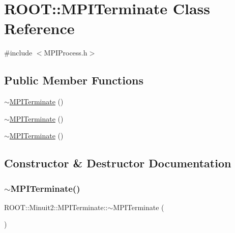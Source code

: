 \hypertarget{classROOT_1_1Minuit2_1_1MPITerminate}{}\section{R\+O\+OT\+:\+:M\+P\+I\+Terminate Class Reference}
\label{classROOT_1_1Minuit2_1_1MPITerminate}


{\ttfamily \#include $<$M\+P\+I\+Process.\+h$>$}

\subsection*{Public Member Functions}
\begin{DoxyCompactItemize}
\item 
\mbox{\hyperlink{classROOT_1_1Minuit2_1_1MPITerminate_a3a0e732a5e0112404bfdd195d7826c98}{$\sim$\+M\+P\+I\+Terminate}} ()
\item 
\mbox{\hyperlink{classROOT_1_1Minuit2_1_1MPITerminate_a3a0e732a5e0112404bfdd195d7826c98}{$\sim$\+M\+P\+I\+Terminate}} ()
\item 
\mbox{\hyperlink{classROOT_1_1Minuit2_1_1MPITerminate_a3a0e732a5e0112404bfdd195d7826c98}{$\sim$\+M\+P\+I\+Terminate}} ()
\end{DoxyCompactItemize}


\subsection{Constructor \& Destructor Documentation}
\mbox{\label{classROOT_1_1Minuit2_1_1MPITerminate_a3a0e732a5e0112404bfdd195d7826c98}} 
\subsubsection{\texorpdfstring{$\sim$MPITerminate()}{~MPITerminate()}\hspace{0.1cm}{\footnotesize\ttfamily [1/3]}}
{\footnotesize\ttfamily R\+O\+O\+T\+::\+Minuit2\+::\+M\+P\+I\+Terminate\+::$\sim$\+M\+P\+I\+Terminate (\begin{DoxyParamCaption}{ }\end{DoxyParamCaption})\hspace{0.3cm}{\ttfamily [inline]}}

